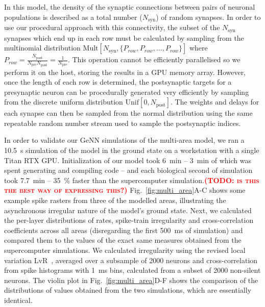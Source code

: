 \documentclass[9pt,twocolumn,twoside,lineno]{pnas-new}
\newcommand{\todo}[1]{\textbf{\textsc{\textcolor{red}{(TODO: #1)}}}}
\begin{document}
In this model, the density of the synaptic connections between pairs of neuronal populations is described as a total number ($N_{\text{syn}}$) of random synapses.
In order to use our procedural approach with this connectivity, the subset of the $N_{\text{syn}}$ synapses which end up in each row must be calculated by sampling from the multinomial distribution $\text{Mult}[N_{\text{syn}}, \{P_{row}, P_{row}, \ldots, P_{row}\}]$ where $P_{row} = \frac{N_{\text{post}}}{N_{\text{pre}} N_{\text{post}}} =  \frac{1}{N_{\text{pre}}} $.
This operation cannot be efficiently parallelised so we perform it on the host, storing the results in a GPU memory array.
However, once the length of each row is determined, the postsynaptic targets for a presynaptic neuron can be procedurally generated very efficiently by sampling from the discrete uniform distribution $\text{Unif}[0, N_{\text{post}}]$.
The weights and delays for each synapse can then be sampled from the normal distribution using the same repeatable random number stream used to sample the postsynaptic indices.

In order to validate our GeNN simulations of the multi-area model, we ran a \SI{10.5}{\second} simulation of the model in the ground state on a workstation with a single Titan RTX GPU.
Initialization of our model took \SI{6}{\minute} -- \SI{3}{\minute} of which was spent generating and compiling code -- and each biological second of simulation took \SI{7.7}{\minute} -- \SI{35}{\percent} faster than the supercomputer simulation.\todo{is this the best way of expressing this?}
Fig.~\ref{fig:multi_area}A-C shows some example spike rasters from three of the modelled areas, illustrating the asynchronous irregular nature of the model's ground state.
Next, we calculated the per-layer distributions of rates, spike-train irregularity and cross-correlation coefficients across all areas (disregarding the first \SI{500}{\milli\second} of simulation) and compared them to the values of the exact same measures obtained from the supercomputer simulations.
We calculated irregularity using the revised local variation LvR~\citep{Shinomoto2009}, averaged over a subsample of \num{2000} neurons and cross-correlation from spike histograms with \SI{1}{\milli\second} bins, calculated from a subset of \num{2000} non-silent neurons. The violin plot in Fig.~\ref{fig:multi_area}D-F shows the comparison of the distributions of values obtained from the two simulations, which are essentially identical.
\end{document}
